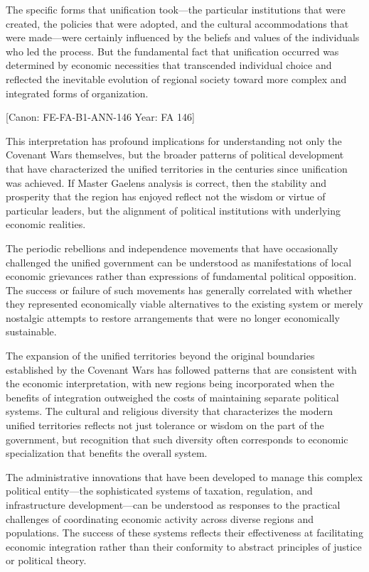 The specific forms that unification took---the particular institutions
that were created, the policies that were adopted, and the cultural
accommodations that were made---were certainly influenced by the beliefs
and values of the individuals who led the process. But the fundamental
fact that unification occurred was determined by economic necessities
that transcended individual choice and reflected the inevitable
evolution of regional society toward more complex and integrated forms
of organization.

{[}Canon: FE-FA-B1-ANN-146 \textbar{} Year: FA 146{]}

This interpretation has profound implications for understanding not only
the Covenant Wars themselves, but the broader patterns of political
development that have characterized the unified territories in the
centuries since unification was achieved. If Master
Gaelen\textquotesingle s analysis is correct, then the stability and
prosperity that the region has enjoyed reflect not the wisdom or virtue
of particular leaders, but the alignment of political institutions with
underlying economic realities.

The periodic rebellions and independence movements that have
occasionally challenged the unified government can be understood as
manifestations of local economic grievances rather than expressions of
fundamental political opposition. The success or failure of such
movements has generally correlated with whether they represented
economically viable alternatives to the existing system or merely
nostalgic attempts to restore arrangements that were no longer
economically sustainable.

The expansion of the unified territories beyond the original boundaries
established by the Covenant Wars has followed patterns that are
consistent with the economic interpretation, with new regions being
incorporated when the benefits of integration outweighed the costs of
maintaining separate political systems. The cultural and religious
diversity that characterizes the modern unified territories reflects not
just tolerance or wisdom on the part of the government, but recognition
that such diversity often corresponds to economic specialization that
benefits the overall system.

The administrative innovations that have been developed to manage this
complex political entity---the sophisticated systems of taxation,
regulation, and infrastructure development---can be understood as
responses to the practical challenges of coordinating economic activity
across diverse regions and populations. The success of these systems
reflects their effectiveness at facilitating economic integration rather
than their conformity to abstract principles of justice or political
theory.

